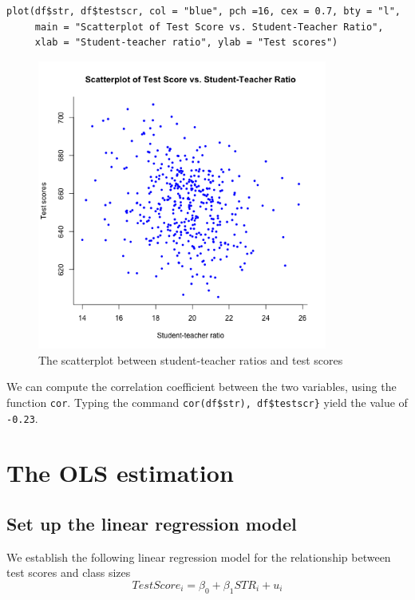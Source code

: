 \documentclass[11pt]{article}
\begin{document}
\begin{verbatim}
plot(df$str, df$testscr, col = "blue", pch =16, cex = 0.7, bty = "l",
     main = "Scatterplot of Test Score vs. Student-Teacher Ratio",
     xlab = "Student-teacher ratio", ylab = "Test scores")
\end{verbatim}

\begin{figure}[htbp]
\centering
\includegraphics[width=0.85\textwidth]{fig42.png}
\caption{The scatterplot between student-teacher ratios and test scores}
\end{figure}

We can compute the correlation coefficient
between the two variables, using the function \texttt{cor}. Typing the
command \texttt{cor(df\$str), df\$testscr\}} yield the value of
\texttt{-0.23}.

\section{The OLS estimation}
\label{sec:org1657707}
\subsection{Set up the linear regression model}
\label{sec:org6918b90}

We establish the following linear regression model for the relationship between
test scores and class sizes
\begin{equation}
\label{eq:testscr-str-1}
TestScore_i = \beta_0 + \beta_1 STR_i + u_i
\end{equation}
\end{document}
